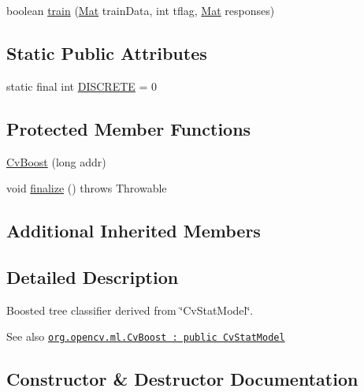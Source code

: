 \begin{DoxyCompactItemize}
\item 
boolean \mbox{\hyperlink{classorg_1_1opencv_1_1ml_1_1_cv_boost_a913a03f5eefe4f24b5bfec56e8ed6347}{train}} (\mbox{\hyperlink{classorg_1_1opencv_1_1core_1_1_mat}{Mat}} train\+Data, int tflag, \mbox{\hyperlink{classorg_1_1opencv_1_1core_1_1_mat}{Mat}} responses)
\end{DoxyCompactItemize}
\subsection*{Static Public Attributes}
\begin{DoxyCompactItemize}
\item 
static final int \mbox{\hyperlink{classorg_1_1opencv_1_1ml_1_1_cv_boost_a20b84a69a44020106f6985b51a456804}{D\+I\+S\+C\+R\+E\+TE}} = 0
\end{DoxyCompactItemize}
\subsection*{Protected Member Functions}
\begin{DoxyCompactItemize}
\item 
\mbox{\hyperlink{classorg_1_1opencv_1_1ml_1_1_cv_boost_a2789d3ee991108259e19fe37a816c0ca}{Cv\+Boost}} (long addr)
\item 
void \mbox{\hyperlink{classorg_1_1opencv_1_1ml_1_1_cv_boost_ac0bd199ed6a084cf601666acccfa54cb}{finalize}} ()  throws Throwable 
\end{DoxyCompactItemize}
\subsection*{Additional Inherited Members}


\subsection{Detailed Description}
Boosted tree classifier derived from \char`\"{}\+Cv\+Stat\+Model\char`\"{}.

\begin{DoxySeeAlso}{See also}
\href{http://docs.opencv.org/modules/ml/doc/boosting.html#cvboost}{\tt org.\+opencv.\+ml.\+Cv\+Boost \+: public Cv\+Stat\+Model} 
\end{DoxySeeAlso}


\subsection{Constructor \& Destructor Documentation}
\mbox{\label{classorg_1_1opencv_1_1ml_1_1_cv_boost_a2789d3ee991108259e19fe37a816c0ca}} 
